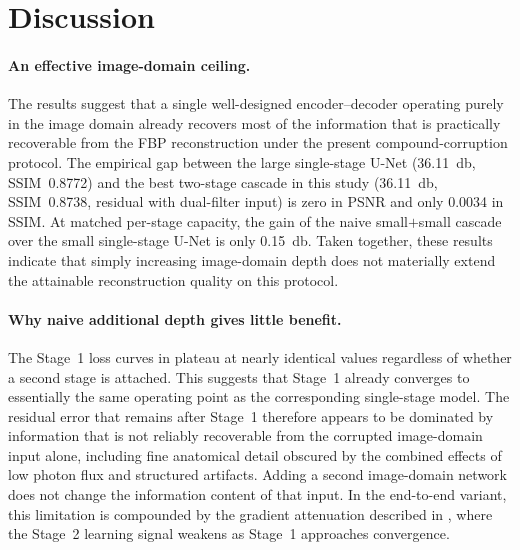 \FloatBarrier
\section{Discussion}
\label{sec:exp_discussion}

\paragraph{An effective image-domain ceiling.}
The results suggest that a single well-designed encoder--decoder operating purely in the image domain already recovers most of the information that is practically recoverable from the FBP reconstruction under the present compound-corruption protocol. The empirical gap between the large single-stage U-Net (\SI{36.11}{\decibel}, SSIM~\num{0.8772}) and the best two-stage cascade in this study (\SI{36.11}{\decibel}, SSIM~\num{0.8738}, residual with dual-filter input) is zero in PSNR and only \num{0.0034} in SSIM. At matched per-stage capacity, the gain of the naive small$+$small cascade over the small single-stage U-Net is only \SI{0.15}{\decibel}. Taken together, these results indicate that simply increasing image-domain depth does not materially extend the attainable reconstruction quality on this protocol.

\paragraph{Why naive additional depth gives little benefit.}
The Stage~1 loss curves in  plateau at nearly identical values regardless of whether a second stage is attached. This suggests that Stage~1 already converges to essentially the same operating point as the corresponding single-stage model. The residual error that remains after Stage~1 therefore appears to be dominated by information that is not reliably recoverable from the corrupted image-domain input alone, including fine anatomical detail obscured by the combined effects of low photon flux and structured artifacts. Adding a second image-domain network does not change the information content of that input. In the end-to-end variant, this limitation is compounded by the gradient attenuation described in , where the Stage~2 learning signal weakens as Stage~1 approaches convergence.

